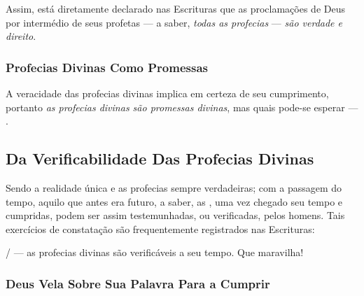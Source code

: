     Assim, está diretamente declarado nas Escrituras que as proclamações de Deus por intermédio de seus profetas  ---  a  saber,
    \emph{todas as profecias} --- \emph{são verdade e direito}.

    \subsubsection{Profecias Divinas Como Promessas}

        
    A veracidade das profecias divinas implica em certeza de seu cumprimento, portanto \emph{as profecias divinas são  promessas
    divinas}, mas quais pode-se esperar --- .

    \subsection{Da Verificabilidade Das Profecias Divinas}

    Sendo a realidade única e as profecias sempre verdadeiras; com a passagem do tempo, aquilo que antes era futuro, a saber, as
    ,  uma  vez  chegado  seu  tempo  e  cumpridas,  podem  ser  assim
    testemunhadas, ou verificadas, pelos homens. Tais exercícios de constatação são frequentemente registrados nas Escrituras:

 
     /  --- as profecias divinas são  verificáveis  a  seu  tempo.  Que
    maravilha!

    \subsubsection{Deus Vela Sobre Sua Palavra Para a Cumprir}

